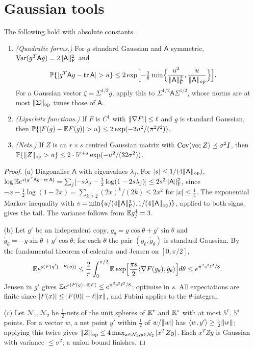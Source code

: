 \section{Gaussian tools}\label{app:gauss}

\begin{lemma}\label{lem:gauss}
The following hold with absolute constants.
\begin{enumerate}[label=(\alph*)]
\item \emph{(Quadratic forms.)} For $g$ standard Gaussian and $\mathsf A$
symmetric, $\operatorname{Var}(g^T\mathsf Ag)=2\lVert \mathsf A\rVert_{\mathrm F}^2$ and
\[
 \Prob\{|g^T\mathsf Ag-\tr\mathsf A|>u\}\le2\exp\Bigl[-\tfrac18\min\Bigl\{\frac{u^2}{\fro{\mathsf A}^2},\frac u{\opn{\mathsf A}}\Bigr\}\Bigr].
\]
For a Gaussian vector $\zeta=\Sigma^{1/2}g$, apply this to
$\Sigma^{1/2}\mathsf A\Sigma^{1/2}$, whose norms are at most $\lVert \Sigma\rVert_{\mathrm{op}}$ times those of
$\mathsf A$.
\item \emph{(Lipschitz functions.)} If $F$ is $C^1$ with $\lVert \nabla F\rVert\le\ell$
and $g$ is standard Gaussian, then
$\Prob\{|F(g)-\E F(g)|>u\}\le2\exp(-2u^2/(\pi^2\ell^2))$.
\item \emph{(Nets.)} If $Z$ is an $r\times s$ centred Gaussian matrix with
$\operatorname{Cov}(\mathrm{vec}\,Z)\preceq\sigma^2I$, then
$\mathbb P\{\lVert Z\rVert_{\mathrm{op}}>u\}\le2\cdot5^{r+s}\exp(-u^2/(32\sigma^2))$.
\end{enumerate}
\end{lemma}

\begin{proof}
(a) Diagonalise $\mathsf A$ with eigenvalues $\lambda_j$. For $|s|\le1/(4\lVert \mathsf A\rVert_{\mathrm{op}})$,
$\log\mathbb E e^{s(g^T\mathsf Ag-\operatorname{tr}\mathsf A)}=\sum_j[-s\lambda_j-\frac12\log(1-2s\lambda_j)]
\le2s^2\lVert \mathsf A\rVert_{\mathrm F}^2$, since $-x-\frac12\log(1-2x)=\sum_{k\ge2}(2x)^k/(2k)\le2x^2$
for $|x|\le\frac14$. The exponential Markov inequality with
$s=\min\{u/(4\lVert \mathsf A\rVert_{\mathrm F}^2),1/(4\lVert \mathsf A\rVert_{\mathrm{op}})\}$, applied to both signs,
gives the tail. The variance follows from $\mathbb E g_j^4=3$.

(b) Let $g'$ be an independent copy, $g_\theta=g\cos\theta+g'\sin\theta$ and
$\dot g_\theta=-g\sin\theta+g'\cos\theta$; for each $\theta$ the pair
$(g_\theta,\dot g_\theta)$ is standard Gaussian. By the fundamental theorem of
calculus and Jensen on $[0,\pi/2]$,
\[
 \mathbb E e^{s(F(g')-F(g))}\le\frac2\pi\int_0^{\pi/2}\mathbb E\exp\Bigl[\frac{\pi s}2\langle \nabla
 F(g_\theta),\dot g_\theta\rangle\Bigr]d\theta\le e^{\pi^2s^2\ell^2/8}.
\]
Jensen in $g'$ gives $\mathbb E e^{s(F(g)-\mathbb E F)}\le e^{\pi^2s^2\ell^2/8}$; optimise in $s$.
All expectations are finite since $|F(x)|\le|F(0)|+\ell\lVert x\rVert$, and Fubini
applies to the $\theta$-integral.

(c) Let $\mathcal N_1,\mathcal N_2$ be $\frac12$-nets of the unit spheres of $\mathbb R^r$
and $\mathbb R^s$ with at most $5^r$, $5^s$ points. For a vector $w$, a net point $y'$
within $\frac12$ of $w/\lVert w\rVert$ has $\langle w,y'\rangle\ge\frac12\lVert w\rVert$; applying this
twice gives $\lVert Z\rVert_{\mathrm{op}}\le4\max_{x\in\mathcal N_1,y\in\mathcal N_2}|x^TZy|$. Each
$x^TZy$ is Gaussian with variance $\le\sigma^2$; a union bound finishes.
\end{proof}


